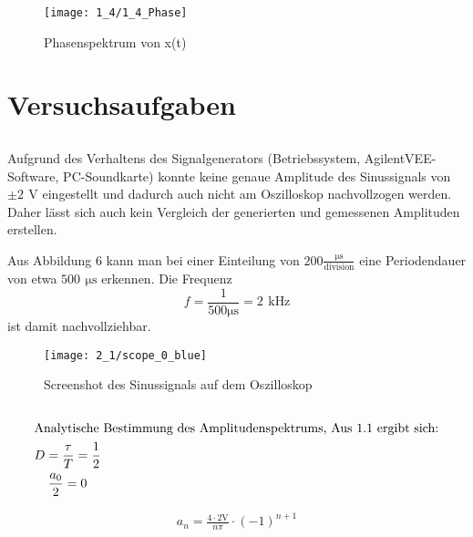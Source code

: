 \documentclass[a4paper, 12pt]{article}
\begin{document}
\begin{figure}[H]
  \texttt{[image: 1\_4/1\_4\_Phase]}
  \caption{Phasenspektrum von x(t)}
\end{figure}

\section{Versuchsaufgaben}

\subsection{}

Aufgrund des Verhaltens des Signalgenerators (Betriebssystem, AgilentVEE-Software, PC-Soundkarte) konnte keine genaue Amplitude des Sinussignals von $\pm 2 \,\ \si{\volt}$ eingestellt und dadurch auch nicht am Oszilloskop nachvollzogen werden. Daher lässt sich auch kein Vergleich der generierten und gemessenen Amplituden erstellen.

\noindent Aus Abbildung 6 kann man bei einer Einteilung von $200 \frac{\si{\micro\second}}{\textrm{division}}$ eine Periodendauer von etwa $500 \,\ \si{\micro\second}$ erkennen. Die Frequenz
$$ f = \frac{1}{500 \si{\micro\second}} = 2 \,\ \si{\kilo\hertz}$$
ist damit nachvollziehbar.

\begin{figure}[H]
  \texttt{[image: 2\_1/scope\_0\_blue]}
  \caption{Screenshot des Sinussignals auf dem Oszilloskop}
\end{figure}

\subsection{}

\begin{gather*}
	\intertext{Analytische Bestimmung des Amplitudenspektrums, Aus 1.1 ergibt sich:}
  D = \frac{\tau}{T} = \frac{1}{2}\\
  \frac{a_0}{2} = 0
\end{gather*}

\begin{gather*}
	a_n = \frac{4 \cdot 2 \si{\volt}}{n \pi}\cdot (-1)^{n+1}\\
\end{gather*}
\end{document}
